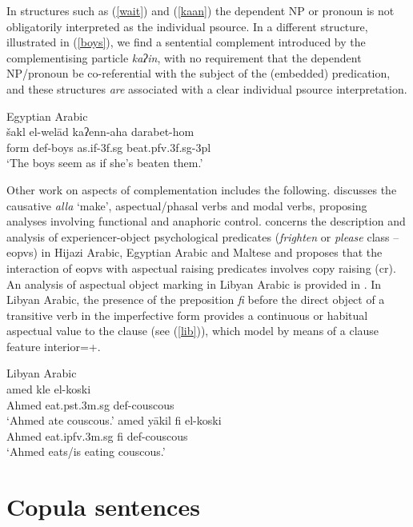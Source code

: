 \documentclass[output=paper,hidelinks]{langscibook}
\begin{document}
In structures such as (\ref{wait}) and (\ref{kaan})  the dependent NP or pronoun is not obligatorily interpreted as the individual {\sc psource}. In a different structure, illustrated in (\ref{boys}), we find a sentential complement introduced by the complementising particle {\em ka{ʔ}in}, with no requirement that the dependent NP/pronoun be co-referential with the  subject of the (embedded) predication, and these structures {\em are}  associated with a clear individual {\sc psource} interpretation.




\ea  \label{boys} Egyptian Arabic \citep[98]{ES:LFG15}\\
\gll šakl el-wel\={a}d kaʔenn-aha darabet-hom\\
form {\sc def}-boys as.if-{\sc 3f.sg} beat.{\sc pfv.3f.sg}-{\sc 3pl}\\
\glt `The boys seem as if she's beaten them.'
\z

Other work on  aspects of complementation includes the following.  \citet{ElSadek:PhD} discusses the causative {\em {\textchi}alla} `make', aspectual/phasal verbs and modal verbs, proposing  analyses involving functional and anaphoric control.  \citet{AACES:LFG13} concerns the description and analysis of
experiencer-object psychological predicates ({\em frighten} or {\em
  please} class -- {\sc eopv}s) in Hijazi Arabic, Egyptian Arabic  and Maltese
and proposes that the interaction of {\sc eopv}s with aspectual
raising predicates involves copy raising ({\sc cr}).   An analysis of aspectual object marking  in Libyan Arabic is provided in \citet{BoerjarsGhadgoudPayne16}.
 In Libyan Arabic,  the presence of the preposition {\em fi} before the direct object of a transitive verb in the imperfective form provides a continuous or habitual aspectual value to the clause (see (\ref{lib})), which \citet{BoerjarsGhadgoudPayne16}  model by means of a clause feature {\sc interior}=+.

\ea \label{lib} Libyan Arabic \citep[126]{BoerjarsGhadgoudPayne16} \\
\ea \gll a{\hwithstroke}med kle el-koski\\
Ahmed eat.{\sc pst.3m.sg} {\sc def}-couscous\\
\glt `Ahmed ate couscous.'
\ex \gll a{\hwithstroke}med y\={a}kil fi el-koski\\
Ahmed eat.{\sc ipfv.3m.sg} {\sc fi} {\sc def}-couscous\\
\glt `Ahmed eats/is eating couscous.'
\z\z


\section{Copula sentences}
\end{document}
